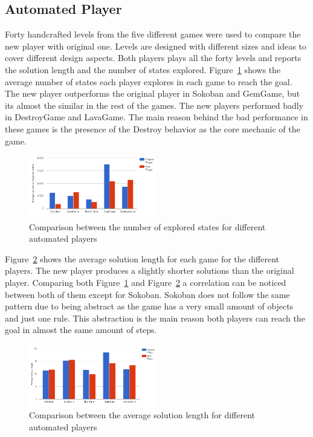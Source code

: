 \documentclass[letterpaper]{article}
\newcommand{\figref}[1]{Figure~\ref{Figure:#1}}
\begin{document}
\subsection{Automated Player}
Forty handcrafted levels from the five different games were used to compare the new player with original one. Levels are designed with different sizes and ideas to cover different design aspects. Both players plays all the forty levels and reports the solution length and the number of states explored. \figref{automatedPlayerPerformance} shows the average number of states each player explores in each game to reach the goal. The new player outperforms the original player in Sokoban and GemGame, but its almost the similar in the rest of the games. The new players performed badly in DestroyGame and LavaGame. The main reason behind the bad performance in these games is the presence of the Destroy behavior as the core mechanic of the game.\\\par

\begin{figure}
  	\centering
    \includegraphics[width=0.5\textwidth]{Images/automatedPlayerPerformance}
    \caption{Comparison between the number of explored states for different automated players}
    \label{Figure:automatedPlayerPerformance}
\end{figure}

\figref{automatedPlayerLength} shows the average solution length for each game for the different players. The new player produces  a slightly shorter solutions than the original player. Comparing both \figref{automatedPlayerPerformance} and \figref{automatedPlayerLength} a correlation can be noticed between both of them except for Sokoban. Sokoban does not follow the same pattern due to being abstract as the game has a very small amount of objects and just one rule. This abstraction is the main reason both players can reach the goal in almost the same amount of steps.

\begin{figure}
  	\centering
    \includegraphics[width=0.5\textwidth]{Images/automatedPlayerLength}
    \caption{Comparison between the average solution length for different automated players}
    \label{Figure:automatedPlayerLength}
\end{figure}
\end{document}
